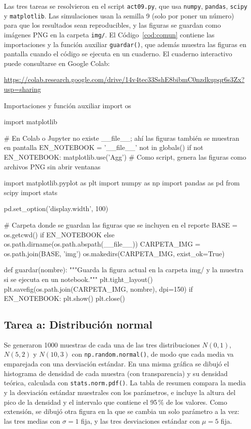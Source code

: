 \documentclass[11pt,letterpaper]{article}
\begin{document}
Las tres tareas se resolvieron en el script \texttt{act09.py}, que usa \texttt{numpy}, \texttt{pandas}, \texttt{scipy} y \texttt{matplotlib}. Las simulaciones usan la semilla 9 (solo por poner un número) para que los resultados sean reproducibles, y las figuras se guardan como imágenes PNG en la carpeta \texttt{img/}. El Código~\ref{cod:comun} contiene las importaciones y la función auxiliar \texttt{guardar()}, que además muestra las figuras en pantalla cuando el código se ejecuta en un cuaderno. El cuaderno interactivo puede consultarse en Google Colab:

\begin{center}
    \url{https://colab.research.google.com/drive/14v4tec33SshE8bibmC0nzdkupqr6s3Zx?usp=sharing}
\end{center}

\begin{codigo}[label=cod:comun]{Importaciones y función auxiliar}
import os

import matplotlib

# En Colab o Jupyter no existe __file__; ahí las figuras también se muestran en pantalla
EN_NOTEBOOK = '__file__' not in globals()
if not EN_NOTEBOOK:
    matplotlib.use('Agg')  # Como script, genera las figuras como archivos PNG sin abrir ventanas

import matplotlib.pyplot as plt
import numpy as np
import pandas as pd
from scipy import stats

pd.set_option('display.width', 100)

# Carpeta donde se guardan las figuras que se incluyen en el reporte
BASE = os.getcwd() if EN_NOTEBOOK else os.path.dirname(os.path.abspath(__file__))
CARPETA_IMG = os.path.join(BASE, 'img')
os.makedirs(CARPETA_IMG, exist_ok=True)


def guardar(nombre):
    """Guarda la figura actual en la carpeta img/ y la muestra si se ejecuta en un notebook."""
    plt.tight_layout()
    plt.savefig(os.path.join(CARPETA_IMG, nombre), dpi=150)
    if EN_NOTEBOOK:
        plt.show()
    plt.close()
\end{codigo}

\subsection{Tarea a: Distribución normal}

Se generaron 1000 muestras de cada una de las tres distribuciones $N(0, 1)$, $N(5, 2)$ y $N(10, 3)$ con \texttt{np.random.normal()}, de modo que cada media va emparejada con una desviación estándar. En una misma gráfica se dibujó el histograma de densidad de cada muestra (con transparencia) y su densidad teórica, calculada con \texttt{stats.norm.pdf()}. La tabla de resumen compara la media y la desviación estándar muestrales con los parámetros, e incluye la altura del pico de la densidad y el intervalo que contiene el 95\,\% de los valores. Como extensión, se dibujó otra figura en la que se cambia un solo parámetro a la vez: las tres medias con $\sigma = 1$ fija, y las tres desviaciones estándar con $\mu = 5$ fija.
\end{document}

